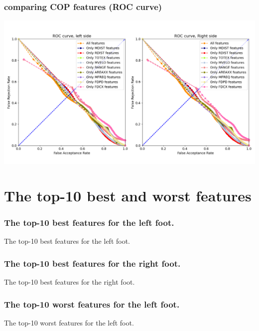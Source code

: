 \documentclass{beamer}
\begin{document}
\begin{frame}
\centering
\frametitle{comparing COP features (ROC curve)}
\includegraphics[scale=0.3]{Manuscripts/src/figures/feat.png}
\end{frame}




\section{The top-10 best and worst features}

\begin{frame}[shrink=10]
\frametitle{The top-10 best features for the left foot.}
\tiny
\begin{table}
\centering
\caption{\small The top-10 best features for the left foot.}

\end{table}
\end{frame}

\begin{frame}[shrink=10]
\frametitle{The top-10 best features for the right foot.}
\tiny
\begin{table}
\centering
\caption{\small The top-10 best features for the right foot.}

\end{table}
\end{frame}

\begin{frame}[shrink=10]
\frametitle{The top-10 worst features for the left foot.}
\tiny
\begin{table}
\centering
\caption{\small The top-10 worst features for the left foot.}

\end{table}
\end{frame}
\end{document}
